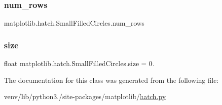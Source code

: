 \subsubsection{\texorpdfstring{num\+\_\+rows}{num\_rows}}
{\footnotesize\ttfamily matplotlib.\+hatch.\+Small\+Filled\+Circles.\+num\+\_\+rows}

\mbox{\label{classmatplotlib_1_1hatch_1_1SmallFilledCircles_a6ceca6a1eec178c3de9d920215e8b0c7}} 
\subsubsection{\texorpdfstring{size}{size}}
{\footnotesize\ttfamily float matplotlib.\+hatch.\+Small\+Filled\+Circles.\+size = 0.\hspace{0.3cm}{\ttfamily [static]}}



The documentation for this class was generated from the following file\+:\begin{DoxyCompactItemize}
\item 
venv/lib/python3./site-\/packages/matplotlib/\hyperlink{hatch_8py}{hatch.\+py}\end{DoxyCompactItemize}
